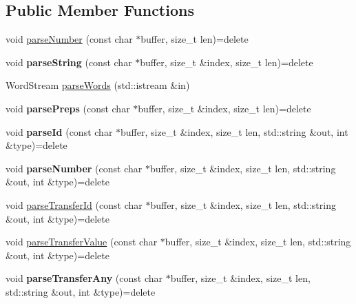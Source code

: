 \subsection*{Public Member Functions}
\begin{DoxyCompactItemize}
\item 
void \hyperlink{classx2_1_1_lexical_parser_ad145a31ea89f2c203bb894226f37c424}{parse\+Number} (const char $\ast$buffer, size\+\_\+t len)=delete
\item 
\mbox{\label{classx2_1_1_lexical_parser_a66dd4881cb37ca304b2431e9cf9f7c2f}} 
void {\bfseries parse\+String} (const char $\ast$buffer, size\+\_\+t \&index, size\+\_\+t len)=delete
\item 
Word\+Stream \hyperlink{classx2_1_1_lexical_parser_ae60c0630386d1f6619fb2ba82955934e}{parse\+Words} (std\+::istream \&in)
\item 
\mbox{\label{classx2_1_1_lexical_parser_a4a3bee404dceece2ca0bfec782d8561b}} 
void {\bfseries parse\+Preps} (const char $\ast$buffer, size\+\_\+t \&index, size\+\_\+t len)=delete
\item 
\mbox{\label{classx2_1_1_lexical_parser_ac6dd1193fa3a1c493a20143196749e3b}} 
void {\bfseries parse\+Id} (const char $\ast$buffer, size\+\_\+t \&index, size\+\_\+t len, std\+::string \&out, int \&type)=delete
\item 
\mbox{\label{classx2_1_1_lexical_parser_a6ef3f63cce691e5f7286988b843dfe27}} 
void {\bfseries parse\+Number} (const char $\ast$buffer, size\+\_\+t \&index, size\+\_\+t len, std\+::string \&out, int \&type)=delete
\item 
void \hyperlink{classx2_1_1_lexical_parser_a0cf09764367aa7e6ccf044150bb9d435}{parse\+Transfer\+Id} (const char $\ast$buffer, size\+\_\+t \&index, size\+\_\+t len, std\+::string \&out, int \&type)=delete
\item 
void \hyperlink{classx2_1_1_lexical_parser_a719a5e77295d26d71de8381757fc1ab5}{parse\+Transfer\+Value} (const char $\ast$buffer, size\+\_\+t \&index, size\+\_\+t len, std\+::string \&out, int \&type)=delete
\item 
\mbox{\label{classx2_1_1_lexical_parser_a56b78c6b78c71f94ed399a0237f452cc}} 
void {\bfseries parse\+Transfer\+Any} (const char $\ast$buffer, size\+\_\+t \&index, size\+\_\+t len, std\+::string \&out, int \&type)=delete

\end{DoxyCompactItemize}

